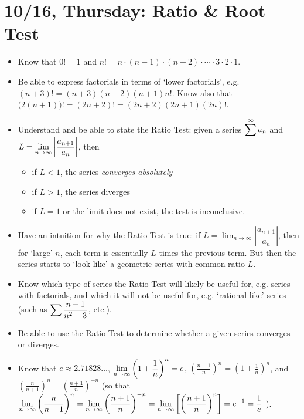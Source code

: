 \documentclass[11pt,letterpaper]{article}
\begin{document}
\newpage
\section*{10/16, Thursday: Ratio \& Root Test\label{10-16}}

\begin{itemize}
\item Know that $0!= 1$ and $n!= n \cdot (n - 1) \cdot (n - 2) \cdot \cdots \cdot 3 \cdot 2 \cdot 1$. 

\item Be able to express factorials in terms of `lower factorials', e.g. $(n + 3)!= (n + 3)(n + 2)(n + 1) n!$. Know also that $\big(2(n + 1) \big)!= (2n + 2)!= (2n + 2)(2n + 1) (2n)!$.

\item Understand and be able to state the Ratio Test: given a series $\displaystyle\sum^\infty a_n$ and $\displaystyle L= \lim_{n \to \infty} \left| \dfrac{a_{n+1}}{a_n} \right|$, then
	\begin{itemize}
	\item if $L < 1$, the series \textit{converges absolutely}
	\item if $L > 1$, the series diverges
	\item if $L= 1$ or the limit does not exist, the test is inconclusive. 
	\end{itemize}

\item Have an intuition for why the Ratio Test is true: if $L= \lim_{n \to \infty} \left| \dfrac{a_{n+1}}{a_n} \right|$, then for `large' $n$, each term is essentially $L$ times the previous term. But then the series starts to `look like' a geometric series with common ratio $L$. 

\item Know which type of series the Ratio Test will likely be useful for, e.g. series with factorials, and which it will not be useful for, e.g. `rational-like' series (such as $\displaystyle\sum \dfrac{n + 1}{n^2 - 3}$, etc.). 

\item Be able to use the Ratio Test to determine whether a given series converges or diverges. 	

\item Know that $e \approx 2.71828\ldots$, $\displaystyle\lim_{n \to \infty} \left(1 + \frac{1}{n} \right)^n= e$, $\left(\frac{n + 1}{n} \right)^n= \left(1 + \frac{1}{n} \right)^n$, and $\left( \frac{n}{n + 1} \right)^n= \left( \frac{n + 1}{n} \right)^{-n}$ (so that $\displaystyle\lim_{n \to \infty} \left( \frac{n}{n + 1} \right)^n= \lim_{n \to \infty} \left( \frac{n + 1}{n} \right)^{-n}= \lim_{n \to \infty} \left[\left( \frac{n + 1}{n} \right)^n \right]= e^{-1}= \frac{1}{e}\,\,$).


\end{itemize}
\end{document}
